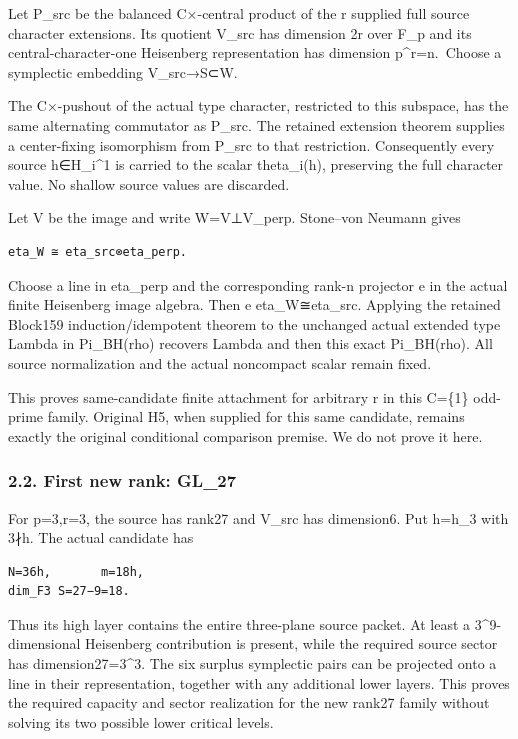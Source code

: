 Let P\_src be the balanced C×-central product of the r supplied full
source character extensions. Its quotient V\_src has dimension 2r over
F\_p and its central-character-one Heisenberg representation has
dimension p\^{}r=n.~Choose a symplectic embedding V\_src→S⊂W.

The C×-pushout of the actual type character, restricted to this
subspace, has the same alternating commutator as P\_src. The retained
extension theorem supplies a center-fixing isomorphism from P\_src to
that restriction. Consequently every source h∈H\_i\^{}1 is carried to
the scalar theta\_i(h), preserving the full character value. No shallow
source values are discarded.

Let V be the image and write W=V⊥V\_perp. Stone--von Neumann gives

\begin{Verbatim}[fontsize=\small,breaklines=true,breakanywhere=true]
eta_W ≅ eta_src⊗eta_perp.
\end{Verbatim}

Choose a line in eta\_perp and the corresponding rank-n projector e in
the actual finite Heisenberg image algebra. Then e eta\_W≅eta\_src.
Applying the retained Block159 induction/idempotent theorem to the
unchanged actual extended type Lambda in Pi\_BH(rho) recovers Lambda and
then this exact Pi\_BH(rho). All source normalization and the actual
noncompact scalar remain fixed.

This proves same-candidate finite attachment for arbitrary r in this
C=\{1\} odd-prime family. Original H5, when supplied for this same
candidate, remains exactly the original conditional comparison premise.
We do not prove it here.

\hypertarget{odd_capacity-first-new-rank-gl_27}{%
\subsubsection{2.2. First new rank: GL\_27}\label{odd_capacity-first-new-rank-gl_27}}

For p=3,r=3, the source has rank27 and V\_src has dimension6. Put h=h\_3
with 3∤h. The actual candidate has

\begin{Verbatim}[fontsize=\small,breaklines=true,breakanywhere=true]
N=36h,       m=18h,
dim_F3 S=27−9=18.
\end{Verbatim}

Thus its high layer contains the entire three-plane source packet. At
least a 3\^{}9-dimensional Heisenberg contribution is present, while the
required source sector has dimension27=3\^{}3. The six surplus
symplectic pairs can be projected onto a line in their representation,
together with any additional lower layers. This proves the required
capacity and sector realization for the new rank27 family without
solving its two possible lower critical levels.

